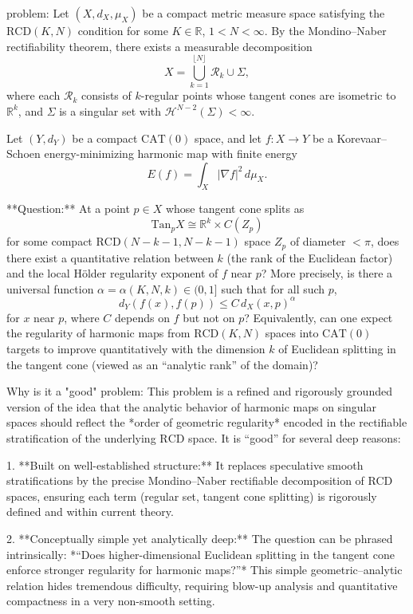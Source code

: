 problem:  
Let \((X,d_X,\mu_X)\) be a compact metric measure space satisfying the \(\mathrm{RCD}(K,N)\) condition for some \(K\in\mathbb{R}\), \(1<N<\infty\).  
By the Mondino–Naber rectifiability theorem, there exists a measurable decomposition  
\[
X = \bigcup_{k=1}^{\lfloor N\rfloor} \mathcal{R}_k \cup \Sigma,
\]
where each \(\mathcal{R}_k\) consists of \(k\)-regular points whose tangent cones are isometric to \(\mathbb{R}^k\), and \(\Sigma\) is a singular set with \(\mathcal{H}^{N-2}(\Sigma)<\infty\).  

Let \((Y,d_Y)\) be a compact \(\mathrm{CAT}(0)\) space, and let \(f:X\to Y\) be a Korevaar–Schoen energy-minimizing harmonic map with finite energy  
\[
E(f)=\int_X |\nabla f|^2\,d\mu_X.
\]  

**Question:**  
At a point \(p\in X\) whose tangent cone splits as  
\[
\mathrm{Tan}_p X \cong \mathbb{R}^k \times C(Z_p)
\]
for some compact \(\mathrm{RCD}(N-k-1,N-k-1)\) space \(Z_p\) of diameter \(<\pi\), does there exist a quantitative relation between \(k\) (the rank of the Euclidean factor) and the local Hölder regularity exponent of \(f\) near \(p\)?  
More precisely, is there a universal function \(\alpha=\alpha(K,N,k)\in(0,1]\) such that for all such \(p\),
\[
d_Y(f(x),f(p)) \le C\, d_X(x,p)^{\alpha}
\]
for \(x\) near \(p\), where \(C\) depends on \(f\) but not on \(p\)?  
Equivalently, can one expect the regularity of harmonic maps from \(\mathrm{RCD}(K,N)\) spaces into \(\mathrm{CAT}(0)\) targets to improve quantitatively with the dimension \(k\) of Euclidean splitting in the tangent cone (viewed as an “analytic rank” of the domain)?  

Why is it a "good" problem:  
This problem is a refined and rigorously grounded version of the idea that the analytic behavior of harmonic maps on singular spaces should reflect the *order of geometric regularity* encoded in the rectifiable stratification of the underlying \(\mathrm{RCD}\) space. It is “good” for several deep reasons:

1. **Built on well-established structure:**  
   It replaces speculative smooth stratifications by the precise Mondino–Naber rectifiable decomposition of RCD spaces, ensuring each term (regular set, tangent cone splitting) is rigorously defined and within current theory.

2. **Conceptually simple yet analytically deep:**  
   The question can be phrased intrinsically: *“Does higher-dimensional Euclidean splitting in the tangent cone enforce stronger regularity for harmonic maps?”*  
   This simple geometric–analytic relation hides tremendous difficulty, requiring blow-up analysis and quantitative compactness in a very non-smooth setting.


